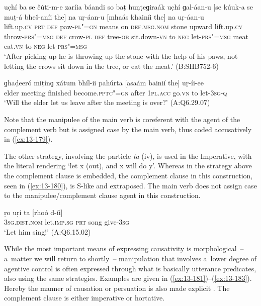 \begin{exe}
\ex
\label{ex:13-178}
\gll uc̣hí ba se čúti-m-e zaríia báandi  so baṭ huṇṭeɡiraák uc̣hí
ɡal-áan-u [se kúuk-a se muṭ-á bheš-aníi the] na  uṛ-áan-u \textsc{[}mhaás
  khainíi the] na uṛ-áan-u \\
lift.up.\textsc{cv} \textsc{prt} \textsc{def} paw-\textsc{pl"=gn} means on  \textsc{def.msg.nom} stone upward lift.up.\textsc{cv} throw-\textsc{prs"=msg}  \textsc{def} crow-\textsc{pl} \textsc{def} tree-\textsc{ob} sit.down-\textsc{vn} to \textsc{neg} let-\textsc{prs"=msg} meat eat.\textsc{vn} to \textsc{neg} let-\textsc{prs"=msg} \\
\glt `After picking up he is throwing up the stone with the help of his paws, not letting the crows sit down in the tree, or eat the meat.' (B:SHB752-6)

\ex
\label{ex:13-179}
\gll ɡhaḍeeró miṭínɡ xátum bhíl-ii pahúrta [asaám  bainií the] uṛ-íi-ee \\
elder meeting finished become.\textsc{pptc"=gn} after \textsc{1pl.acc} go.\textsc{vn} to let-\textsc{3sg-q} \\
\glt `Will the elder let us leave after the meeting is over?' (A:Q6.29.07) 
\end{exe}

Note that the manipulee of the main verb is coreferent with the agent of the complement verb but is assigned case by the main verb, thus coded accusatively in (\ref{ex:13-179}).


The other strategy, involving the particle \textit{ta} (iv), is used in the Imperative, with the literal rendering `let x (out), and x will do y'. Whereas in the strategy above the complement clause is embedded, the complement clause in this construction, seen in (\ref{ex:13-180}), is S-like and extraposed. The main verb does not assign case to the manipulee/complement clause agent in this construction.

\begin{exe}
\ex
\label{ex:13-180}
\gll ṛo uṛí ta [rhoó d-íi] \\
\textsc{3sg.dist.nom} let.\textsc{imp.sg} \textsc{ prt} song give-\textsc{3sg} \\
\glt `Let him sing!' (A:Q6.15.02) 
\end{exe}

 While the most important means of expressing causativity is morphological~-- a~matter we will return to shortly~-- manipulation that involves a~lower degree of agentive control \citep[45]{givon2001b} is often expressed through what is basically utterance predicates, also using the same strategies. Examples are given in (\ref{ex:13-181})--(\ref{ex:13-183}). Hereby the manner of causation or persuation is also made explicit \citep[126]{noonan1985}. The complement clause is either imperative or hortative.

